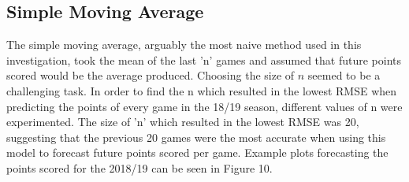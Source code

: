 \documentclass[a4paper,11pt,twoside]{article}
\begin{document}
\subsection{Simple Moving Average}

The simple moving average, arguably the most naive method used in this investigation, took  the mean of the last 'n' games and assumed that future points scored would be the average produced. Choosing the size of $n$ seemed to be a challenging task. In order to find the n which resulted in the lowest RMSE when predicting the points of every game in the 18/19 season, different values of n were experimented. The size of 'n' which resulted in the lowest RMSE was 20, suggesting that the previous 20 games were the most accurate when using this model to forecast future points scored per game. Example plots forecasting the points scored for the 2018/19 can be seen in Figure 10.
\end{document}

